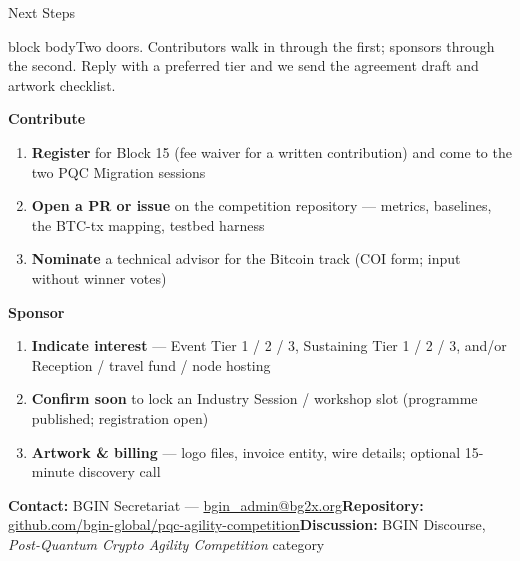 \documentclass[aspectratio=169,10pt]{beamer}
\newcommand{\lead}[1]{\begin{beamercolorbox}[wd=\textwidth,sep=2.5mm,rounded=false]{block body}\small #1\end{beamercolorbox}\vspace{2mm}}
\begin{document}
\begin{frame}{Next Steps}
  \lead{Two doors. Contributors walk in through the first; sponsors through the second. Reply with a preferred tier and we send the agreement draft and artwork checklist.}
  {\small\textbf{Contribute}}
  \begin{enumerate}\small
    \item \textbf{Register} for Block 15 (fee waiver for a written contribution) and come to the two PQC Migration sessions
    \item \textbf{Open a PR or issue} on the competition repository --- metrics, baselines, the BTC-tx mapping, testbed harness
    \item \textbf{Nominate} a technical advisor for the Bitcoin track (COI form; input without winner votes)
  \end{enumerate}
  {\small\textbf{Sponsor}}
  \begin{enumerate}\small
    \item \textbf{Indicate interest} --- Event Tier 1 / 2 / 3, Sustaining Tier 1 / 2 / 3, and/or Reception / travel fund / node hosting
    \item \textbf{Confirm soon} to lock an Industry Session / workshop slot (programme published; registration open)
    \item \textbf{Artwork \& billing} --- logo files, invoice entity, wire details; optional 15-minute discovery call
  \end{enumerate}
  {\small\textbf{Contact:} BGIN Secretariat --- \href{mailto:bgin_admin@bg2x.org}{bgin\_admin@bg2x.org}\quad\textbf{Repository:} \href{https://github.com/bgin-global/pqc-agility-competition}{github.com/bgin-global/pqc-agility-competition}\quad\textbf{Discussion:} BGIN Discourse, \emph{Post-Quantum Crypto Agility Competition} category}
\end{frame}
\end{document}
